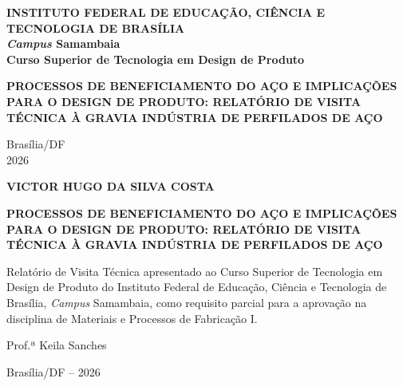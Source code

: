 \documentclass[
  12pt,
  a4paper,
  oneside,
  brazil,
  chapter=TITLE
]{article}
\date{}
\begin{document}
\begin{titlepage}
  \thispagestyle{empty}
  \begin{center}

    \vspace{2cm}

    {\normalsize\bfseries
      INSTITUTO FEDERAL DE EDUCAÇÃO, CIÊNCIA E TECNOLOGIA DE BRASÍLIA\\[0.3em]
      \textit{Campus} Samambaia\\[0.3em]
      Curso Superior de Tecnologia em Design de Produto
    }

    \vfill

    {\large\bfseries
      PROCESSOS DE BENEFICIAMENTO DO AÇO E IMPLICAÇÕES PARA O DESIGN DE PRODUTO: RELATÓRIO DE VISITA TÉCNICA À GRAVIA INDÚSTRIA DE PERFILADOS DE AÇO
    }

    \vfill

    {\normalsize Brasília/DF\\2026}

  \end{center}
\end{titlepage}
\setcounter{page}{2}

\begin{titlepage}
  \thispagestyle{empty}
  \begin{center}

    {\normalsize\bfseries VICTOR HUGO DA SILVA COSTA}

    \vfill

    {\large\bfseries PROCESSOS DE BENEFICIAMENTO DO AÇO E IMPLICAÇÕES PARA O DESIGN DE PRODUTO: RELATÓRIO DE VISITA TÉCNICA À GRAVIA INDÚSTRIA DE PERFILADOS DE AÇO}

    \vfill

    \begin{flushright}
      \begin{minipage}{0.5\textwidth}
        \normalsize
        Relatório de Visita Técnica apresentado ao Curso Superior de Tecnologia em Design de Produto do Instituto Federal de Educação, Ciência e Tecnologia de Brasília, \textit{Campus} Samambaia, como requisito parcial para a aprovação na disciplina de Materiais e Processos de Fabricação I.

        \vspace{1em}
        Prof.ª Keila Sanches
      \end{minipage}
    \end{flushright}

    \vfill

    {\normalsize Brasília/DF -- 2026}

  \end{center}
\end{titlepage}
\end{document}
